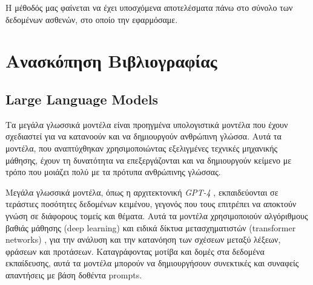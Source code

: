 \documentclass[12pt]{extarticle}
\begin{document}
Η μέθοδός μας φαίνεται να έχει υποσχόμενα αποτελέσματα πάνω στο σύνολο των δεδομένων ασθενών, στο οποίο
την εφαρμόσαμε.





\section{Ανασκόπηση Βιβλιογραφίας}

\subsection{Large Language Models}

Τα μεγάλα γλωσσικά μοντέλα \cite{zhao2023survey} είναι προηγμένα υπολογιστικά μοντέλα που έχουν σχεδιαστεί για να κατανοούν και να δημιουργούν ανθρώπινη γλώσσα. Αυτά τα μοντέλα, που αναπτύχθηκαν χρησιμοποιώντας εξελιγμένες τεχνικές μηχανικής μάθησης, έχουν τη δυνατότητα να επεξεργάζονται και να δημιουργούν κείμενο με τρόπο που μοιάζει πολύ με τα πρότυπα ανθρώπινης γλώσσας.

Μεγάλα γλωσσικά μοντέλα, όπως η αρχιτεκτονική \textit{GPT-4} \cite{openai2023gpt4}, εκπαιδεύονται σε τεράστιες ποσότητες δεδομένων κειμένου, γεγονός που τους επιτρέπει να αποκτούν γνώση σε διάφορους τομείς και θέματα. Αυτά τα μοντέλα χρησιμοποιούν αλγόριθμους βαθιάς μάθησης (deep learning) \cite{Sarker2021} και ειδικά δίκτυα μετασχηματιστών (transformer networks) \cite{Dosovitskiy2020}, για την ανάλυση και την κατανόηση των σχέσεων μεταξύ λέξεων, φράσεων και προτάσεων. Καταγράφοντας μοτίβα και δομές στα δεδομένα εκπαίδευσης, αυτά τα μοντέλα μπορούν να δημιουργήσουν συνεκτικές και συναφείς
απαντήσεις με βάση δοθέντα prompts.
\end{document}

